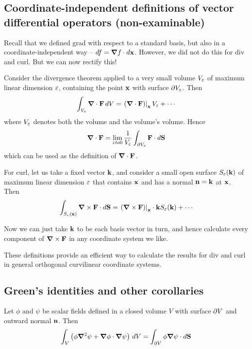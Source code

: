 \documentclass{../../template/note}
\begin{document}
    \subsection{Coordinate-independent definitions of vector differential operators (non-examinable)}

    Recall that we defined grad with respect to a standard basis, but also in a coordinate-independent way -- \(df = \grad f \cdot d\V x\). However, we did not do this for div and curl. But we can now rectify this!

    Consider the divergence theorem applied to a very small volume \(V_\varepsilon\) of maximum linear dimension \(\varepsilon\), containing the point \(\V x\) with surface \(\partial V_\varepsilon\). Then
    \begin{align*}
        \int_{V_\eps} \div \V F \D V = \left.\left(\div \V F\right)\right|_{\V x} V_\eps + \cdots
    \end{align*}
    where \(V_\varepsilon\) denotes both the volume and the volume's volume. Hence
    \begin{align*}
        \div \V F = \lim_{\eps to 0} \frac{1}{V_\eps} \int_{\pr V_\eps} \V F \cdot d\V S
    \end{align*}
    which can be used as the definition of \(\div \V F\).

    For curl, let us take a fixed vector \(\V k\), and consider a small open surface \(S_\eps(\V k)\) of maximum linear dimension \(\varepsilon\) that contains \(\V x\) and has a normal \(\V n = \V k\) at \(\V x\). Then
    \begin{align*}
        \int_{S_\eps(\V x)} \curl \V F \cdot d\V S = \left.\left(\curl \V F\right)\right|_{\V x} \cdot \V k S_{\eps}(\V k) + \cdots
    \end{align*}

    Now we can just take \(\V k\) to be each basis vector in turn, and hence calculate every component of \(\curl \V F\) in any coordinate system we like.

    These definitions provide an efficient way to calculate the results for div and curl in general orthogonal curvilinear coordinate systems.
    
    \subsection{Green's identities and other corollaries}

    \begin{proposition*}
        Let \(\phi\) and \(\psi\) be scalar fields defined in a closed volume \(V\) with surface \(\partial V\) and outward normal \(\V n\). Then
        \begin{align*}
            \int_V \left(\phi \grad^2 \psi + \grad \phi \cdot \grad \psi\right) \D V = \int_{\pr V} \phi \grad \psi \cdot d\V S
        \end{align*}
    \end{proposition*}
    
\end{document}
